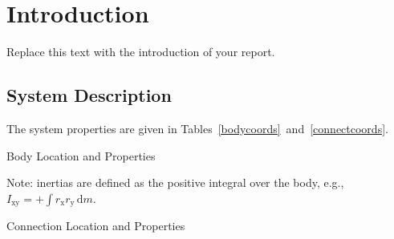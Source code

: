 \chapter{Introduction}
Replace this text with the introduction of your report.
\section{System Description}
The system properties are given in Tables~\ref{bodycoords}~and~\ref{connectcoords}.
\begin{table}[ht]
\begin{center}
\begin{threeparttable}
\begin{footnotesize}
\caption{Body Location and Properties}
\label{bodycoords}
\begin{tablenotes}
\item Note: inertias are defined as the positive integral over the body, e.g., $I_{\textrm{xy}}=+\! \int \! r_{\textrm{x}}r_{\textrm{y}} \,\text{d}m $.
\end{tablenotes}
\end{footnotesize}
\end{threeparttable}
\end{center}
\end{table}
\begin{table}[ht]
\begin{center}
\begin{threeparttable}
\begin{footnotesize}
\caption{Connection Location and Properties}
\label{connectcoords}
\end{footnotesize}
\end{threeparttable}
\end{center}
\end{table}
